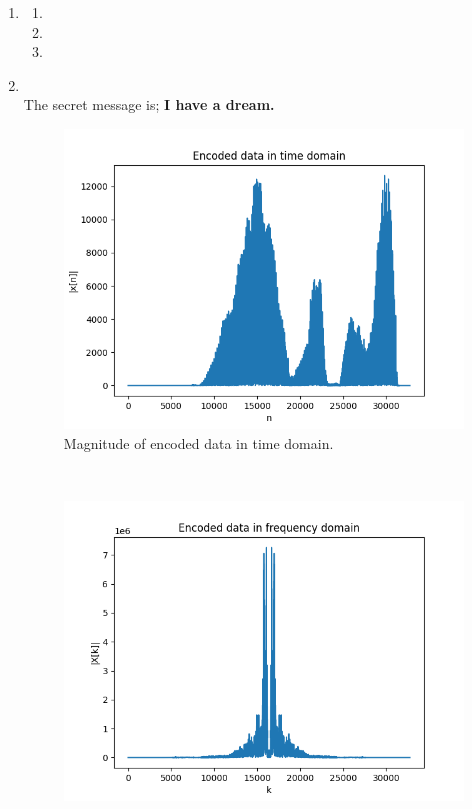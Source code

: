 \documentclass[10pt,a4paper, margin=1in]{article}
\begin{document}
\begin{enumerate}
    \item %
          \begin{enumerate}
              \item %
              \item %
              \item %
          \end{enumerate}

    \item ~\\
          The secret message is; \textbf{I have a dream.}\\
          \begin{figure}[H]
            \includegraphics[scale = 0.75]{e_t}
            \caption{Magnitude of encoded data in time domain.}
          \end{figure}~\\
          \begin{figure}[H]
            \includegraphics[scale = 0.75]{e_f}

\end{figure}
\end{enumerate}
\end{document}
